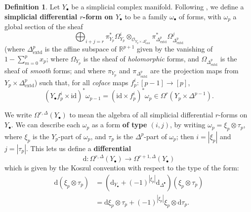 \documentclass[11pt,fleqn]{article}
\theoremstyle{plain}
\theoremstyle{definition}
\newtheorem{definition}[theorem]{Definition}
\theoremstyle{remark}
\numberwithin{equation}{theorem}
\newcommand{\OO}{\mathcal{O}}
\newcommand{\id}{\mathrm{id}}
\newcommand{\define}[1]{\textbf{#1}}
\renewcommand{\d}{\mathrm{d}}
\begin{document}
        \begin{definition}
            Let $Y_\bullet$ be a simplicial complex manifold.
            Following \cite{Dupont1976}, we define a \define{simplicial differential $r$-form on $Y_{\bullet}$} to be a family $\omega_\bullet$ of forms, with $\omega_p$ a global section of the sheaf
            \[
                \bigoplus_{i+j=r}
                    \pi_{Y_p}^* \Omega_{Y_p}^i
                    \otimes_{\OO_{Y_p\times \Delta^p_\mathrm{extd}}}
                    \pi_{\Delta^p_\mathrm{extd}}^* \Omega_{\Delta^p_\mathrm{extd}}^j
            \]
            (where $\Delta^p_\mathrm{extd}$ is the affine subspace of $\mathbb{R}^{p+1}$ given by the vanishing of $1-\sum_{m=0}^p x_p$; where $\Omega_{Y_p}$ is the sheaf of \emph{holomorphic} forms, and $\Omega_{\Delta^p_\mathrm{extd}}$ is the sheaf of \emph{smooth} forms; and where $\pi_{Y_p}$ and $\pi_{\Delta^p_\mathrm{extd}}$ are the projection maps from $Y_p\times\Delta^p_\mathrm{extd}$) such that, for all \emph{coface} maps $f_p^i\colon[p-1]\to[p]$,
            \begin{equation}
            \label{equation:simplicial-gluing-condition-for-forms}
                \left(Y_\bullet f_p^i\times\id\right)^*\omega_{p-1}
                = \left(\id\times f_p^i\right)^*\omega_p
                \in \Omega^r(Y_{p}\times\Delta^{p-1}).
            \end{equation}

            We write $\Omega^{r,\Delta}(Y_\bullet)$ to mean the algebra of all simplicial differential $r$-forms on $Y_\bullet$.
            We can describe each $\omega_p$ as a form \define{of type $(i,j)$}, by writing $\omega_p = \xi_p\otimes\tau_p$, where $\xi_p$ is the $Y_p$-part of $\omega_p$, and $\tau_p$ is the $\Delta^p$-part of $\omega_p$; then $i=|\xi_p|$ and $j=|\tau_p|$.
            This lets us define a \define{differential}
            \[
                \d \colon \Omega^{r,\Delta}(Y_\bullet) \longrightarrow \Omega^{r+1,\Delta}(Y_\bullet)
            \]
            which is given by the Koszul convention with respect to the type of the form:
            \begin{align*}
                \d(\xi_p\otimes\tau_p)
                &= \left(\d_{Y_\bullet} + (-1)^{|\xi_p|}\d_{\Delta^\bullet}\right) (\xi_p\otimes\tau_p)
            \\  &= \d\xi_p\otimes\tau_p + (-1)^{|\xi_p|}\xi_p\otimes\d\tau_p.
            \end{align*}
        \end{definition}
\end{document}
